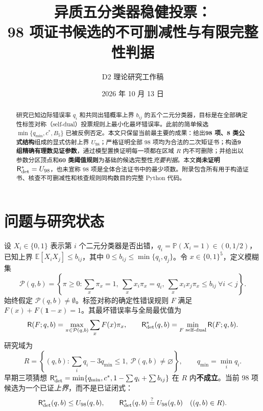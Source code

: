 \documentclass[11pt,a4paper]{ctexart}
\title{\bfseries 异质五分类器稳健投票：\\[-2pt]98 项证书候选的不可删减性与有限完整性判据}
\author{D2 理论研究工作稿}
\date{2026 年 10 月 13 日}
\theoremstyle{definition}
\newcommand{\Risk}{\mathsf R}
\newcommand{\calP}{\mathcal P}
\newcommand{\EE}{\mathbb E}
\newcommand{\PP}{\mathbb P}
\begin{document}
\maketitle
\begin{abstract}
研究已知边际错误率 $q_i$ 和共同出错概率上界 $b_{ij}$ 的五个二元分类器，目标是在全部确定性标签对称（self-dual）投票规则上最小化最坏错误率。此前的简单候选 $\min\{q_{\min},c^*,B_5\}$ 已被反例否定。本文只保留当前最主要的成果：给出\textbf{98 项、8 类公式结构}组成的显式仿射上界 $U_{98}$；严格证明全部 98 项均为合法的二次矩证书；构造\textbf{9 组精确有理数见证参数}，通过模型置换证明每一项都在区域 $R$ 内不可删除；并给出以参数分区顶点和\textbf{60 类阈值规则}为基础的候选完整性\emph{充要判据}。本文\textbf{尚未证明} $\Risk_{\rm det}^*=U_{98}$，也未宣称 98 项是全体合法证书中的最少项数。附录包含所有用于构造证书、核查不可删减性和核查规则同构数目的完整 Python 代码。
\end{abstract}

\section{问题与研究状态}
设 $X_i\in\{0,1\}$ 表示第 $i$ 个二元分类器是否出错，$q_i=\PP(X_i=1)\in(0,1/2)$，已知上界 $\EE[X_iX_j]\le b_{ij}$，其中 $0\le b_{ij}\le\min\{q_i,q_j\}$。令 $x\in\{0,1\}^5$，定义模糊集
\begin{equation}\label{eq:ambig}
\calP(q,b)=\left\{\pi\ge0: \sum_x\pi_x=1,\ \sum_xx_i\pi_x=q_i,\ \sum_xx_ix_j\pi_x\le b_{ij}\ \forall i<j\right\}.
\end{equation}
始终假定 $\calP(q,b)\ne\emptyset$。标签对称的确定性错误规则 $F$ 满足 $F(x)+F(\mathbf1-x)=1$。其最坏错误率与全局最优值为
\begin{equation}\label{eq:game}
\Risk(F;q,b)=\max_{\pi\in\calP(q,b)}\sum_xF(x)\pi_x,\qquad
\Risk_{\rm det}^*(q,b)=\min_{F\text{ self-dual}}\Risk(F;q,b).
\end{equation}
研究域为
\begin{equation}\label{eq:R}
R=\left\{(q,b):\sum_iq_i-3q_{\min}\le1,\ \calP(q,b)\ne\varnothing\right\},\qquad q_{\min}=\min_iq_i.
\end{equation}
早期三项猜想 $\Risk_{\rm det}^*=\min\{q_{\min},c^*,1-\sum q_i+\sum b_{ij}\}$ 在 $R$ 内\textbf{不成立}。当前 98 项候选为一个已证\emph{上界}，而不是已证闭式：
\begin{equation}\label{eq:ub}
\Risk_{\rm det}^*(q,b)\le U_{98}(q,b),\qquad
\Risk_{\rm det}^*(q,b)\stackrel{?}{=}U_{98}(q,b)\quad((q,b)\in R).
\end{equation}
\end{document}

